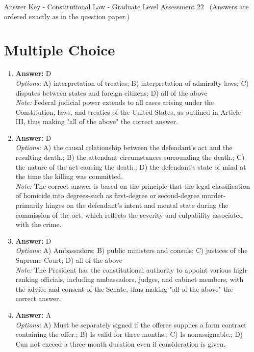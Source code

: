 \documentclass[12pt]{article}
\begin{document}
\begin{center}
Answer Key - Constitutional Law - Graduate Level Assessment 22 \
\small (Answers are ordered exactly as in the question paper.)
\end{center}

\section*{Multiple Choice}
\begin{enumerate}[label=\arabic*.]
\item \textbf{Answer:} D
\\ \textit{Options:} A) interpretation of treaties; B) interpretation of admiralty laws; C) disputes between states and foreign citizens; D) all of the above
\\ \textit{Note:} Federal judicial power extends to all cases arising under the Constitution, laws, and treaties of the United States, as outlined in Article III, thus making "all of the above" the correct answer.
\item \textbf{Answer:} D
\\ \textit{Options:} A) the causal relationship between the defendant's act and the resulting death.; B) the attendant circumstances surrounding the death.; C) the nature of the act causing the death.; D) the defendant's state of mind at the time the killing was committed.
\\ \textit{Note:} The correct answer is based on the principle that the legal classification of homicide into degrees-such as first-degree or second-degree murder-primarily hinges on the defendant's intent and mental state during the commission of the act, which reflects the severity and culpability associated with the crime.
\item \textbf{Answer:} D
\\ \textit{Options:} A) Ambassadors; B) public ministers and consuls; C) justices of the Supreme Court; D) all of the above
\\ \textit{Note:} The President has the constitutional authority to appoint various high-ranking officials, including ambassadors, judges, and cabinet members, with the advice and consent of the Senate, thus making "all of the above" the correct answer.
\item \textbf{Answer:} A
\\ \textit{Options:} A) Must be separately signed if the offeree supplies a form contract containing the offer.; B) Is valid for three months.; C) Is nonassignable.; D) Can not exceed a three-month duration even if consideration is given.

\end{enumerate}
\end{document}
